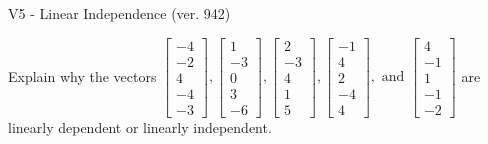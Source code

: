 \begin{exercise}
  \begin{exerciseTitle}V5 - Linear Independence (ver. 942)\end{exerciseTitle}
  \begin{exerciseStatement}
    Explain why the vectors \(\left[\begin{array}{r}
-4 \\
-2 \\
4 \\
-4 \\
-3
\end{array}\right] , \left[\begin{array}{r}
1 \\
-3 \\
0 \\
3 \\
-6
\end{array}\right] , \left[\begin{array}{r}
2 \\
-3 \\
4 \\
1 \\
5
\end{array}\right] , \left[\begin{array}{r}
-1 \\
4 \\
2 \\
-4 \\
4
\end{array}\right] , \text{ and } \left[\begin{array}{r}
4 \\
-1 \\
1 \\
-1 \\
-2
\end{array}\right]\) are linearly dependent or linearly independent.	



\end{exerciseStatement}
\end{exercise}
